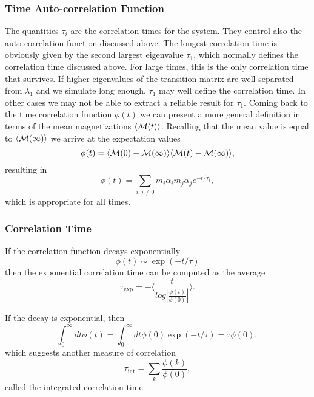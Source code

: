 \documentclass[compress]{beamer}
\begin{document}
\frame
{
  \frametitle{Time Auto-correlation Function}
\begin{small}
{\scriptsize
The quantities $\tau_i$ are the correlation times for the system. They control also the auto-correlation function 
discussed above.  The longest correlation time is obviously given by the second largest
eigenvalue $\tau_1$, which normally defines the correlation time discussed above. For large times, this is the 
only correlation time that survives. If higher eigenvalues of the transition matrix are well separated from 
$\lambda_1$ and we simulate long enough,  $\tau_1$ may well define the correlation time. 
In other cases we may not be able to extract a reliable result for $\tau_1$. 
Coming back to the time correlation function $\phi(t)$ we can present a more general definition in terms
of the mean magnetizations $ \langle {\cal M}(t) \rangle$. Recalling that the mean value is equal 
to $ \langle {\cal M}(\infty) \rangle$ we arrive at the expectation values
\[
\phi(t) =\langle {\cal M}(0)-{\cal M}(\infty)\rangle \langle {\cal M}(t)-{\cal M}(\infty)\rangle,
\]
resulting in
\[
\phi(t) =\sum_{i,j\ne 0}m_i\alpha_im_j\alpha_je^{-t/\tau_i},
\]
which is appropriate for all times.
}
\end{small}
}



\frame
{
  \frametitle{Correlation Time}
\begin{small}
{\scriptsize
If the correlation function decays exponentially
\[ \phi (t) \sim \exp{(-t/\tau)}\]
then the exponential correlation time can be computed as the average
\[   \tau_{\mathrm{exp}}  =  -\langle  \frac{t}{log|\frac{\phi(t)}{\phi(0)}|} \rangle. \]

If the decay is exponential, then
\[  \int_0^{\infty} dt \phi(t)  = \int_0^{\infty} dt \phi(0)\exp{(-t/\tau)}  = \tau \phi(0),\] 
which  suggests another measure of correlation
\[   \tau_{\mathrm{int}} = \sum_k \frac{\phi(k)}{\phi(0)}, \]
called the integrated correlation time.
}
\end{small}
}
\end{document}
